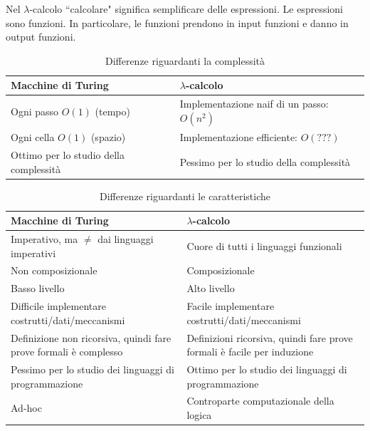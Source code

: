 \documentclass{article}
\begin{document}
\bigskip

Nel $\lambda$-calcolo ``calcolare" significa semplificare delle espressioni. Le espressioni sono funzioni. In particolare, le funzioni prendono in input funzioni e danno in output funzioni.

\begin{table}[!ht]
    \centering
    \begin{tabularx}{\textwidth}{|X|X|}
        \hline
        \textbf{Macchine di Turing} & \textbf{$\lambda$-calcolo}  \\ \hline
        Ogni passo $O(1)$ (tempo) & Implementazione naif di un passo: $O(n^2)$  \\ \hline
        Ogni cella $O(1)$ (spazio) & Implementazione efficiente: $O(???)$   \\ \hline
        Ottimo per lo studio della complessità & Pessimo per lo studio della complessità \\ \hline
    \end{tabularx}
    \caption{Differenze riguardanti la complessità}
    \label{tab:turvslam-compl}
\end{table}

\begin{table}[!ht]
    \centering
    \begin{tabularx}{\textwidth}{|X|X|}
        \hline
        \textbf{Macchine di Turing} & \textbf{$\lambda$-calcolo}  \\ \hline
        Imperativo, ma $\not =$ dai linguaggi imperativi & Cuore di tutti i linguaggi funzionali  \\ \hline
        Non composizionale & Composizionale \\ \hline
        Basso livello & Alto livello  \\ \hline
        Difficile implementare costrutti/dati/meccanismi & Facile implementare costrutti/dati/meccanismi  \\ \hline
        Definizione non ricorsiva, quindi fare prove formali è complesso & Definizioni ricorsiva, quindi fare prove formali è facile per induzione \\ \hline
        Pessimo per lo studio dei linguaggi di programmazione & Ottimo per lo studio dei linguaggi di programmazione \\ \hline
        Ad-hoc & Controparte computazionale della logica \\ \hline
    \end{tabularx}
    \caption{Differenze riguardanti le caratteristiche}
    \label{tab:turvslam-ling}
\end{table}
\end{document}
